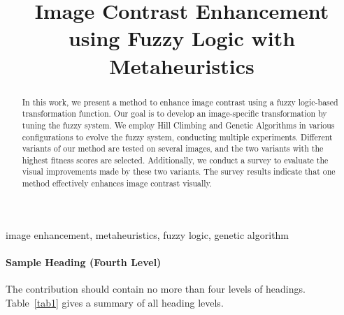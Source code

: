 \documentclass[conference]{IEEEtran}
\begin{document}
%

\title{Image Contrast Enhancement using Fuzzy Logic with Metaheuristics}
%
%
%
\maketitle              %
%
\begin{abstract}
    In this work, we present a method to enhance image contrast using a fuzzy logic-based transformation function. 
    Our goal is to develop an image-specific transformation by tuning the fuzzy system. 
    We employ Hill Climbing and Genetic Algorithms in various configurations to evolve the fuzzy system, conducting multiple experiments. 
    Different variants of our method are tested on several images, and the two variants with the highest fitness scores are selected. 
    Additionally, we conduct a survey to evaluate the visual improvements made by these two variants. 
    The survey results indicate that one method effectively enhances image contrast visually.
\end{abstract}

\begin{IEEEkeywords}
image enhancement, metaheuristics,  fuzzy logic, genetic algorithm
\end{IEEEkeywords}
%
%
%









\iffalse
\paragraph{Sample Heading (Fourth Level)}
The contribution should contain no more than four levels of
headings. Table~\ref{tab1} gives a summary of all heading levels.
\end{document}
